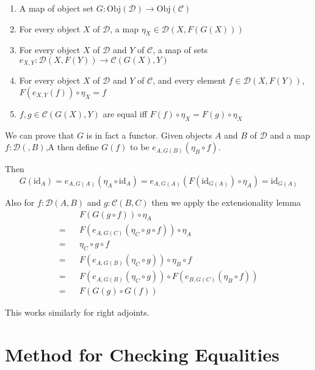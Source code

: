 \documentclass[12pt]{article} %
\theoremstyle{definition}
\theoremstyle{definition}
\theoremstyle{definition}
\theoremstyle{definition}
\begin{document}
\begin{enumerate}
  \item A map of object set $G : \text{Obj}(\mathcal{D})\to \text{Obj}(\mathcal{C})$
  \item For every object $X$ of $\mathcal{D}$, a map $\eta_X \in \mathcal{D}(X, F(G(X)))$
  \item For every object $X$ of $\mathcal{D}$ and $Y$ of $\mathcal{C}$,
    a map of sets $e_{X,Y} : \mathcal{D}(X, F(Y)) \to \mathcal{C}(G(X), Y)$
  \item For every object $X$ of $\mathcal{D}$ and $Y$ of $\mathcal{C}$,
    and every element $f \in \mathcal{D}(X, F(Y))$, $F(e_{X,Y}(f)) \circ \eta_X = f$
  \item $f,g \in \mathcal{C}(G(X), Y)$ are equal iff $F(f) \circ \eta_X = F(g) \circ \eta_X$
\end{enumerate}

We can prove that $G$ is in fact a functor.
Given objects $A$ and $B$ of $\mathcal{D}$ and a map $f : \mathcal{D}(, B)$,A
then define $G(f)$ to be $e_{A,G(B)}(\eta_B \circ f)$.

Then
\begin{equation}
  G(\text{id}_A) = e_{A,G(A)}(\eta_A \circ \text{id}_A) =
e_{A,G(A)}(F (\text{id}_{G(A)}) \circ \eta_A) = \text{id}_{G(A)}
\end{equation}

Also for $f : \mathcal{D}(A, B)$ and $g : \mathcal{C}(B, C)$
then we apply the extensionality lemma
\begin{equation}
  \begin{aligned}
     && F(G(g \circ f)) \circ \eta_A \\
   = && F(e_{A, G(C)}(\eta_C \circ g \circ f)) \circ \eta_A \\
   = && \eta_C \circ g \circ f \\
   = && F(e_{A, G(B)}(\eta_C \circ g)) \circ \eta_B \circ f \\
   = && F(e_{A, G(B)}(\eta_C \circ g)) \circ F(e_{B, G(C)}(\eta_B \circ f)) \\
   = && F(G(g) \circ G(f))
  \end{aligned}
\end{equation}

This works similarly for right adjoints.

\section{Method for Checking Equalities}
\end{document}
